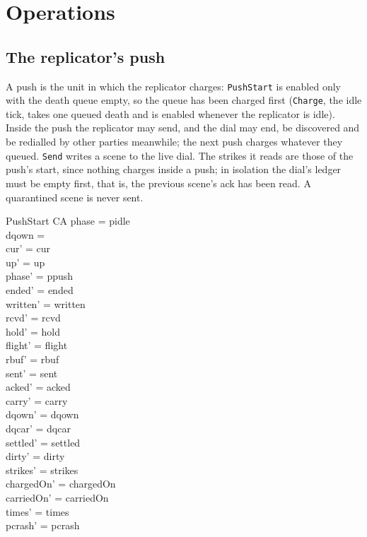\documentclass[a4paper,10pt,fleqn]{article}
\begin{document}
\section{Operations}

\subsection{The replicator's push}

A push is the unit in which the replicator charges: \texttt{PushStart} is
enabled only with the death queue empty, so the queue has been charged first
(\texttt{Charge}, the idle tick, takes one queued death and is enabled whenever
the replicator is idle).  Inside the push the replicator may send, and the dial
may end, be discovered and be redialled by other parties meanwhile; the next
push charges whatever they queued.  \texttt{Send} writes a scene to the live
dial.  The strikes it reads are those of the push's start, since nothing charges
inside a push; in isolation the dial's ledger must be empty first, that is, the
previous scene's ack has been read.  A quarantined scene is never sent.

\begin{schema}{PushStart}
  \Delta CA
\where
  phase = pidle \\
  dqown = \emptyset \\
  cur' = cur \\
  up' = up \\
  phase' = ppush \\
  ended' = ended \\
  written' = written \\
  rcvd' = rcvd \\
  hold' = hold \\
  flight' = flight \\
  rbuf' = rbuf \\
  sent' = sent \\
  acked' = acked \\
  carry' = carry \\
  dqown' = dqown \\
  dqcar' = dqcar \\
  settled' = settled \\
  dirty' = dirty \\
  strikes' = strikes \\
  chargedOn' = chargedOn \\
  carriedOn' = carriedOn \\
  times' = times \\
  pcrash' = pcrash
\end{schema}
\end{document}
